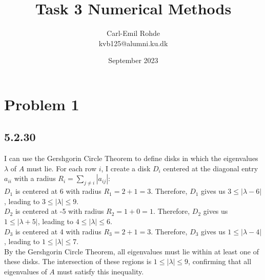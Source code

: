\documentclass[manuscript,screen,review]{acmart}
\begin{document}
\title{Task 3  Numerical Methods}
\author{Carl-Emil Rohde \\ kvb125@alumni.ku.dk}
\date{September 2023}

\maketitle

\section*{Problem 1}

\subsection*{5.2.30}
I can use the Gershgorin Circle Theorem to define disks in which the eigenvalues $\lambda$ of $A$ must lie. For each row $i$, I create a disk $D_i$ centered at the diagonal entry $a_{i i}$ with a radius $R_i=\sum_{j \neq i}\left|a_{i j}\right|$:
\\
\textbf{$D_1$} is centered at 6 with radius $R_1=2+1=3$. Therefore, $D_1$ gives us $3 \leq|\lambda-6|$, leading to $3 \leq|\lambda| \leq 9$.
\\
\textbf{$D_2$} is centered at -5 with radius $R_2=1+0=1$. Therefore, $D_2$ gives us $1 \leq|\lambda+5|$, leading to $4 \leq|\lambda| \leq 6$.
\\
\textbf{$D_3$} is centered at 4 with radius $R_3=2+1=3$. Therefore, $D_3$ gives us $1 \leq|\lambda-4|$, leading to $1 \leq|\lambda| \leq 7$.
\\
By the Gershgorin Circle Theorem, all eigenvalues must lie within at least one of these disks. The intersection of these regions is $1 \leq|\lambda| \leq 9$, confirming that all eigenvalues of $A$ must satisfy this inequality.
\end{document}
